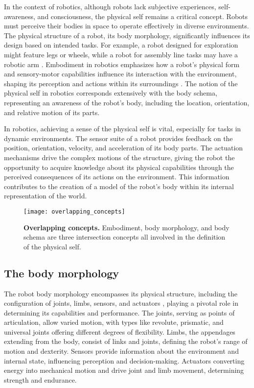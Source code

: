 In the context of robotics, although robots lack subjective experiences, self-awareness, and consciousness, the physical self remains a critical concept. Robots must perceive their bodies in space to operate effectively in diverse environments. The physical structure of a robot, its body morphology, significantly influences its design based on intended tasks. For example, a robot designed for exploration might feature legs or wheels, while a robot for assembly line tasks may have a robotic arm \cite{Miller2018EmbodimentSituatednessMorphology}. Embodiment in robotics emphasizes how a robot's physical form and sensory-motor capabilities influence its interaction with the environment, shaping its perception and actions within its surroundings \cite{Wainer2006rolephysicalembodiment}. The notion of the physical self in robotics corresponds extensively with the body schema, representing an awareness of the robot's body, including the location, orientation, and relative motion of its parts.

In robotics, achieving a sense of the physical self is vital, especially for tasks in dynamic environments. The sensor suite of a robot provides feedback on the position, orientation, velocity, and acceleration of its body parts. The actuation mechanisms drive the complex motions of the structure, giving the robot the opportunity to acquire knowledge about its physical capabilities through the perceived consequences of its actions on the environment. This information contributes to the creation of a model of the robot's body within its internal representation of the world.
\begin{figure}
	\begin{center}
		\texttt{[image: overlapping\_concepts]}
		\caption{\textbf{Overlapping concepts.} Embodiment, body morphology, and body schema are three intersection concepts all involved in the definition of the physical self.}
		\label{fig:overlapping_concepts}
	\end{center}
\end{figure}

\subsection{The body morphology}
The robot body morphology encompasses its physical structure, including the configuration of joints, limbs, sensors, and actuators \cite{Pfeifer2007SelfOrganizationEmbodiment}, playing a pivotal role in determining its capabilities and performance. The joints, serving as points of articulation, allow varied motion, with types like revolute, prismatic, and universal joints offering different degrees of flexibility. Limbs, the appendages extending from the body, consist of links and joints, defining the robot's range of motion and dexterity. Sensors provide information about the environment and internal state, influencing perception and decision-making. Actuators converting energy into mechanical motion and drive joint and limb movement, determining strength and endurance.

